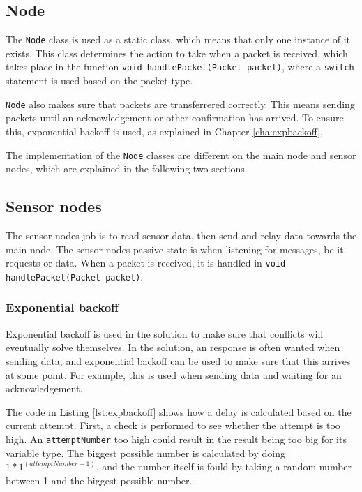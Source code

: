 \subsection{Node}
The \texttt{Node} class is used as a static class, which means that only one instance of it exists. This class determines the action to take when a packet is received, which takes place in the function \texttt{void handlePacket(Packet packet)}, where a \texttt{switch} statement is used based on the packet type.

\texttt{Node} also makes sure that packets are transferrered correctly. This means sending packets until an acknowledgement or other confirmation has arrived. To ensure this, exponential backoff is used, as explained in Chapter \ref{cha:expbackoff}.

The implementation of the \texttt{Node} classes are different on the main node and sensor nodes, which are explained in the following two sections.

\subsection{Sensor nodes} 
The sensor nodes job is to read sensor data, then send and relay data towards the main node. The sensor nodes passive state is when listening for messages, be it requests or data. When a packet is received, it is handled in \texttt{void handlePacket(Packet packet)}.  




\subsubsection*{Exponential backoff}
Exponential backoff is used in the solution to make sure that conflicts will eventually solve themselves. In the solution, an response is often wanted when sending data, and exponential backoff can be used to make sure that this arrives at some point. For example, this is used when sending data and waiting for an acknowledgement.

The code in Listing \ref{lst:expbackoff} shows how a delay is calculated based on the current attempt. First, a check is performed to see whether the attempt is too high. An \texttt{attemptNumber} too high could result in the result being too big for its variable type. 
The biggest possible number is calculated by doing $1 * 1^(attemptNumber-1)$, and the number itself is fould by taking a random number between 1 and the biggest possible number.

